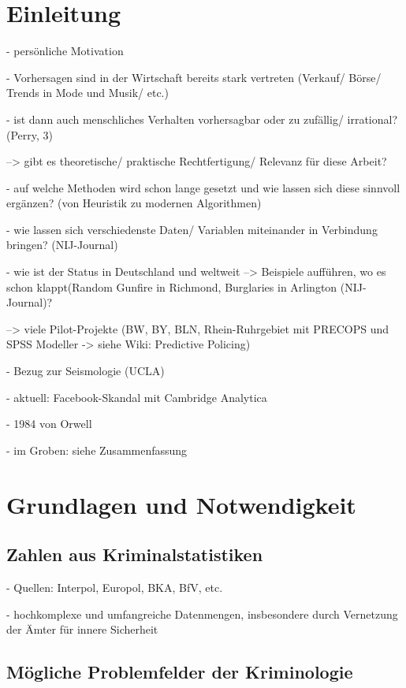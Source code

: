 \documentclass[a4paper,12pt,parskip,bibtotoc,liststotoc]{article}
\begin{document}
\newpage
\section{Einleitung}

- persönliche Motivation

- Vorhersagen sind in der Wirtschaft bereits stark vertreten (Verkauf/ Börse/ Trends in Mode und Musik/ etc.)

- ist dann auch menschliches Verhalten vorhersagbar oder zu zufällig/ irrational? (Perry, 3)

--> gibt es theoretische/ praktische Rechtfertigung/ Relevanz für diese Arbeit?

- auf welche Methoden wird schon lange gesetzt und wie lassen sich diese sinnvoll ergänzen? (von Heuristik zu modernen Algorithmen)

- wie lassen sich verschiedenste Daten/ Variablen miteinander in Verbindung bringen? (NIJ-Journal)

- wie ist der Status in Deutschland und weltweit 
--> Beispiele aufführen, wo es schon klappt(Random Gunfire in Richmond, Burglaries in Arlington (NIJ-Journal)?

--> viele Pilot-Projekte (BW, BY, BLN, Rhein-Ruhrgebiet mit PRECOPS und SPSS Modeller -> siehe Wiki: Predictive Policing)

- Bezug zur Seismologie (UCLA)

- aktuell: Facebook-Skandal mit Cambridge Analytica 

- 1984 von Orwell


- im Groben: siehe Zusammenfassung 


\newpage
\section{Grundlagen und Notwendigkeit}

\subsection{Zahlen aus Kriminalstatistiken}
 
- Quellen: Interpol, Europol, BKA, BfV, etc. 

- hochkomplexe und umfangreiche Datenmengen, insbesondere durch Vernetzung der Ämter für innere Sicherheit

\subsection{Mögliche Problemfelder der Kriminologie}  
\end{document}

